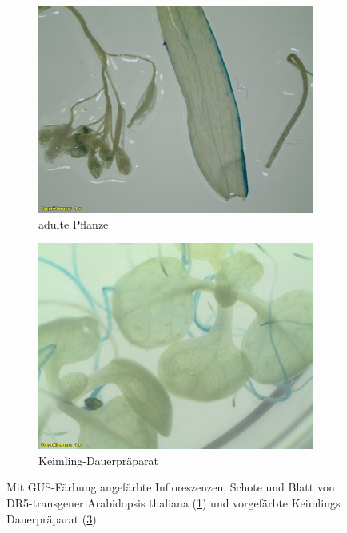 \documentclass[10pt,a4paper]{article}
\begin{document}
		\begin{figure}[H]
			\centering
			\begin{subfigure}[b]{0.45\textwidth}
				\includegraphics[width=\textwidth]{DR5_O+A.jpg}
				\caption{adulte Pflanze}
				\label{fig:DR5_Färbung}
			\end{subfigure}
			\hfill
			\begin{subfigure}[b]{0.45\textwidth}
				\includegraphics[width=\textwidth]{DR5_DP_O+A.jpg}
				\caption{Keimling-Dauerpräparat}
				\label{fig:DR5_DP}
			\end{subfigure}
			\caption{Mit GUS-Färbung angefärbte Infloreszenzen, Schote und Blatt von DR5-transgener Arabidopsis thaliana (\ref{fig:DR5_Färbung}) und vorgefärbte Keimlings Dauerpräparat (\ref{fig:DR5_DP})}
		\end{figure}
\end{document}
